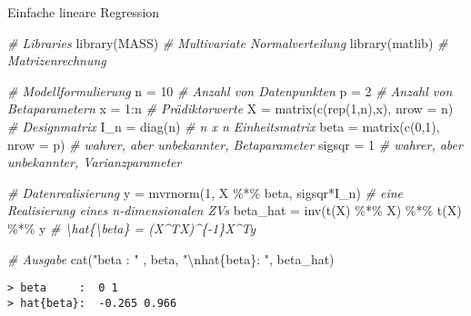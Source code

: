 \documentclass[
  8pt,
  ignorenonframetext,
]{beamer}
\newenvironment{Shaded}{\begin{snugshade}}{\end{snugshade}}
\newcommand{\AttributeTok}[1]{\textcolor[rgb]{0.77,0.63,0.00}{#1}}
\newcommand{\CommentTok}[1]{\textcolor[rgb]{0.56,0.35,0.01}{\textit{#1}}}
\newcommand{\DecValTok}[1]{\textcolor[rgb]{0.00,0.00,0.81}{#1}}
\newcommand{\FunctionTok}[1]{\textcolor[rgb]{0.00,0.00,0.00}{#1}}
\newcommand{\NormalTok}[1]{#1}
\newcommand{\OtherTok}[1]{\textcolor[rgb]{0.56,0.35,0.01}{#1}}
\newcommand{\SpecialCharTok}[1]{\textcolor[rgb]{0.00,0.00,0.00}{#1}}
\newcommand{\StringTok}[1]{\textcolor[rgb]{0.31,0.60,0.02}{#1}}
\begin{document}
\begin{frame}[fragile]{Einfache lineare Regression}
\protect\hypertarget{einfache-lineare-regression-6}{}
\footnotesize

\begin{Shaded}
\begin{Highlighting}[]
\CommentTok{\# Libraries}
\FunctionTok{library}\NormalTok{(MASS)                                  }\CommentTok{\# Multivariate Normalverteilung }
\FunctionTok{library}\NormalTok{(matlib)                                }\CommentTok{\# Matrizenrechnung}

\CommentTok{\# Modellformulierung}
\NormalTok{n        }\OtherTok{=} \DecValTok{10}                                  \CommentTok{\# Anzahl von Datenpunkten}
\NormalTok{p        }\OtherTok{=} \DecValTok{2}                                   \CommentTok{\# Anzahl von Betaparametern}
\NormalTok{x        }\OtherTok{=} \DecValTok{1}\SpecialCharTok{:}\NormalTok{n                                 }\CommentTok{\# Prädiktorwerte}
\NormalTok{X        }\OtherTok{=} \FunctionTok{matrix}\NormalTok{(}\FunctionTok{c}\NormalTok{(}\FunctionTok{rep}\NormalTok{(}\DecValTok{1}\NormalTok{,n),x), }\AttributeTok{nrow =}\NormalTok{ n)     }\CommentTok{\# Designmatrix}
\NormalTok{I\_n      }\OtherTok{=} \FunctionTok{diag}\NormalTok{(n)                             }\CommentTok{\# n x n Einheitsmatrix}
\NormalTok{beta     }\OtherTok{=} \FunctionTok{matrix}\NormalTok{(}\FunctionTok{c}\NormalTok{(}\DecValTok{0}\NormalTok{,}\DecValTok{1}\NormalTok{), }\AttributeTok{nrow =}\NormalTok{ p)            }\CommentTok{\# wahrer, aber unbekannter, Betaparameter}
\NormalTok{sigsqr   }\OtherTok{=} \DecValTok{1}                                   \CommentTok{\# wahrer, aber unbekannter, Varianzparameter}

\CommentTok{\# Datenrealisierung}
\NormalTok{y        }\OtherTok{=} \FunctionTok{mvrnorm}\NormalTok{(}\DecValTok{1}\NormalTok{, X }\SpecialCharTok{\%*\%}\NormalTok{ beta, sigsqr}\SpecialCharTok{*}\NormalTok{I\_n)  }\CommentTok{\# eine Realisierung eines n{-}dimensionalen ZVs}
\NormalTok{beta\_hat }\OtherTok{=} \FunctionTok{inv}\NormalTok{(}\FunctionTok{t}\NormalTok{(X) }\SpecialCharTok{\%*\%}\NormalTok{ X) }\SpecialCharTok{\%*\%} \FunctionTok{t}\NormalTok{(X) }\SpecialCharTok{\%*\%}\NormalTok{ y      }\CommentTok{\# \textbackslash{}hat\{\textbackslash{}beta\} = (X\^{}TX)\^{}\{{-}1\}X\^{}Ty}

\CommentTok{\# Ausgabe}
\FunctionTok{cat}\NormalTok{(}\StringTok{"beta     : "}\NormalTok{  , beta,}
    \StringTok{"}\SpecialCharTok{\textbackslash{}n}\StringTok{hat\{beta\}: "}\NormalTok{, beta\_hat)}
\end{Highlighting}
\end{Shaded}

\begin{verbatim}
> beta     :  0 1 
> hat{beta}:  -0.265 0.966
\end{verbatim}
\end{frame}
\end{document}
